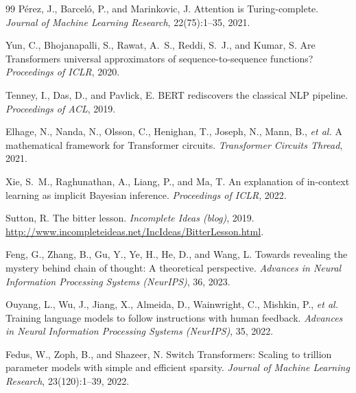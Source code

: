 \documentclass[11pt,a4paper]{article}
\theoremstyle{definition}
\theoremstyle{plain}
\begin{document}
\begin{thebibliography}{99}
  P\'{e}rez, J., Barcel\'{o}, P., and Marinkovic, J.
  \newblock Attention is Turing-complete.
  \newblock \textit{Journal of Machine Learning Research}, 22(75):1--35, 2021.

  Yun, C., Bhojanapalli, S., Rawat, A.\ S., Reddi, S.\ J., and Kumar, S.
  \newblock Are Transformers universal approximators of sequence-to-sequence functions?
  \newblock \textit{Proceedings of ICLR}, 2020.

  Tenney, I., Das, D., and Pavlick, E.
  \newblock BERT rediscovers the classical NLP pipeline.
  \newblock \textit{Proceedings of ACL}, 2019.

  Elhage, N., Nanda, N., Olsson, C., Henighan, T., Joseph, N., Mann, B.,
  \textit{et al.}
  \newblock A mathematical framework for Transformer circuits.
  \newblock \textit{Transformer Circuits Thread}, 2021.

  Xie, S.\ M., Raghunathan, A., Liang, P., and Ma, T.
  \newblock An explanation of in-context learning as implicit Bayesian inference.
  \newblock \textit{Proceedings of ICLR}, 2022.

  Sutton, R.
  \newblock The bitter lesson.
  \newblock \textit{Incomplete Ideas (blog)}, 2019.
  \newblock \url{http://www.incompleteideas.net/IncIdeas/BitterLesson.html}.

  Feng, G., Zhang, B., Gu, Y., Ye, H., He, D., and Wang, L.
  \newblock Towards revealing the mystery behind chain of thought: A theoretical perspective.
  \newblock \textit{Advances in Neural Information Processing Systems (NeurIPS)}, 36, 2023.

  Ouyang, L., Wu, J., Jiang, X., Almeida, D., Wainwright, C., Mishkin, P.,
  \textit{et al.}
  \newblock Training language models to follow instructions with human feedback.
  \newblock \textit{Advances in Neural Information Processing Systems (NeurIPS)}, 35, 2022.

  Fedus, W., Zoph, B., and Shazeer, N.
  \newblock Switch Transformers: Scaling to trillion parameter models with simple
  and efficient sparsity.
  \newblock \textit{Journal of Machine Learning Research}, 23(120):1--39, 2022.

\end{thebibliography}
\end{document}
